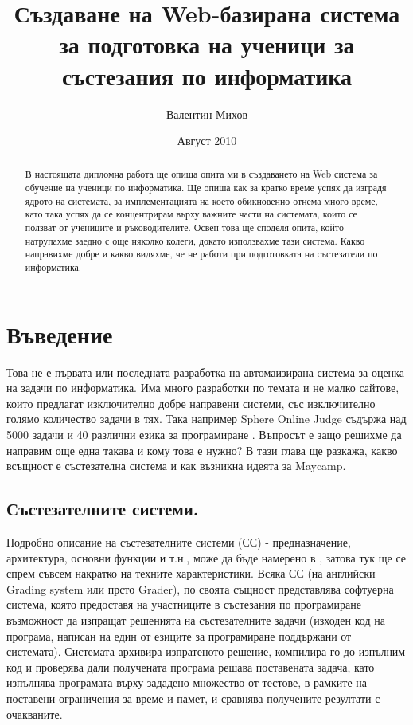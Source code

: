 \documentclass[a4paper,12pt]{article}
\begin{document}
  \title{Създаване на Web-базирана система за подготовка на ученици за състезания по информатика}
  \author{Валентин Михов}
  \date{Август 2010}
  
  \maketitle
  
  \begin{abstract}
    
    В настоящата дипломна работа ще опиша опита ми в създаването на Web система за обучение на ученици по информатика. Ще опиша как за кратко време успях да изградя ядрото на системата, за имплементацията на което обикновенно отнема много време, като така успях да се концентрирам върху важните части на системата, които се ползват от учениците и ръководителите. Освен това ще споделя опита, който натрупахме заедно с още няколко колеги, докато използвахме тази система. Какво направихме добре и какво видяхме, че не работи при подготовката на състезатели по информатика.
  \end{abstract}
  
  \newpage

  \tableofcontents
  
 \newpage
  
  \section{Въведение}
    Това не е първата или последната разработка на автомаизирана система за оценка на задачи по информатика. Има много разработки по темата и не малко сайтове, които предлагат изключително добре направени системи, със изключително голямо количество задачи в тях. Така например Sphere Online Judge съдържа над 5000 задачи и 40 различни езика за програмиране \cite{online_judge_list}. Въпросът е защо решихме да направим още една такава и кому това е нужно? В тази глава ще разкажа, какво всъщност е състезателна система и как възникна идеята за Maycamp.
    
    \subsection{Състезателните системи.} Подробно описание на състезателните системи (СС) - предназначение, архитектура, основни функции и т.н., може да бъде намерено в \cite{grading_sys_manev}, затова тук ще се спрем съвсем накратко на техните характеристики. Всяка СС (на английски Grading system или прсто Grader), по своята същност представлява софтуерна система, която предоставя на участниците в състезания по програмиране възможност да изпращат решенията на състезателните задачи (изходен код на програма, написан на един от езиците за програмиране поддържани от системата). Системата архивира изпратеното решение, компилира го до изпълним код и проверява дали получената програма решава поставената задача, като изпълнява програмата върху зададено множество от тестове, в рамките на поставени ограничения за време и памет, и сравнява получените резултати с очакваните. 
\end{document}
